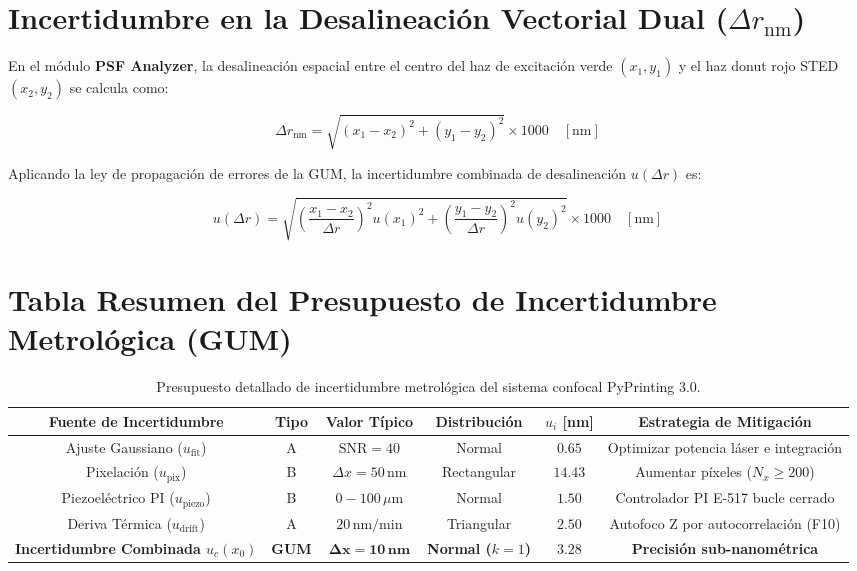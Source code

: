 \documentclass[11pt,a4paper]{article}
\begin{document}
\section{Incertidumbre en la Desalineación Vectorial Dual ($\Delta r_{\text{nm}}$)}

En el módulo \textbf{PSF Analyzer}, la desalineación espacial entre el centro del haz de excitación verde $(x_1, y_1)$ y el haz donut rojo STED $(x_2, y_2)$ se calcula como:

\begin{equation}
    \Delta r_{\text{nm}} = \sqrt{(x_1 - x_2)^2 + (y_1 - y_2)^2} \times 1000 \quad [\text{nm}]
\end{equation}

Aplicando la ley de propagación de errores de la GUM, la incertidumbre combinada de desalineación $u(\Delta r)$ es:

\begin{equation}
    u(\Delta r) = \sqrt{ \left(\frac{x_1 - x_2}{\Delta r}\right)^2 u(x_1)^2 + \left(\frac{y_1 - y_2}{\Delta r}\right)^2 u(y_2)^2 } \times 1000 \quad [\text{nm}]
\end{equation}

\section{Tabla Resumen del Presupuesto de Incertidumbre Metrológica (GUM)}

\begin{table}[h!]
\centering
\caption{Presupuesto detallado de incertidumbre metrológica del sistema confocal PyPrinting 3.0.}
\vspace{4pt}
\small
\begin{tabular}{cccccc}
\toprule
\textbf{Fuente de Incertidumbre} & \textbf{Tipo} & \textbf{Valor Típico} & \textbf{Distribución} & \textbf{$u_i$ [nm]} & \textbf{Estrategia de Mitigación} \\
\midrule
Ajuste Gaussiano ($u_{\text{fit}}$) & A & $\text{SNR} = 40$ & Normal & $0.65$ & Optimizar potencia láser e integración \\
Pixelación ($u_{\text{pix}}$) & B & $\Delta x = 50\,\text{nm}$ & Rectangular & $14.43$ & Aumentar píxeles ($N_x \ge 200$) \\
Piezoeléctrico PI ($u_{\text{piezo}}$) & B & $0-100\,\mu\text{m}$ & Normal & $1.50$ & Controlador PI E-517 bucle cerrado \\
Deriva Térmica ($u_{\text{drift}}$) & A & $20\,\text{nm/min}$ & Triangular & $2.50$ & Autofoco Z por autocorrelación (F10) \\
\midrule
\textbf{Incertidumbre Combinada $u_c(x_0)$} & \textbf{GUM} & $\mathbf{\Delta x = 10\,\text{nm}}$ & \textbf{Normal ($k=1$)} & $\mathbf{3.28}$ & \textbf{Precisión sub-nanométrica} \\
\bottomrule
\end{tabular}
\end{table}
\end{document}
